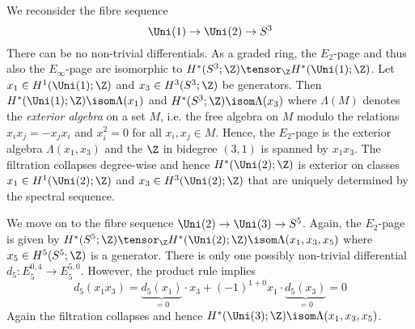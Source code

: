 \documentclass[wip, topology]{bsteffan-lecturenotes}
\begin{document}
\begin{example}
	We reconsider the fibre sequence
	\begin{equation*}
		\Uni(1) \to \Uni(2) \to S^3
	\end{equation*}
	There can be no non-trivial differentials.
	As a graded ring, the $E_2$-page and thus also the $E_\infty$-page are isomorphic to $H^*(S^3; \Z) \tensor_{\Z} H^*(\Uni(1); \Z)$.
	Let $x_1 \in H^1(\Uni(1); \Z)$ and $x_3 \in H^3(S^3; \Z)$ be generators.
	Then $H^*(\Uni(1); \Z) \isom \Lambda(x_1)$ and $H^*(S^3; \Z) \isom \Lambda(x_3)$ where $\Lambda(M)$ denotes the \emph{exterior algebra} on a set $M$, i.e. the free algebra on $M$ modulo the relations $x_i x_j = -x_j x_i$ and $x_i^2 = 0$ for all $x_i, x_j \in M$.
	Hence, the $E_2$-page is the exterior algebra $\Lambda(x_1, x_3)$ and the $\Z$ in bidegree $(3, 1)$ is spanned by $x_1 x_3$.
	The filtration collapses degree-wise and hence $H^*(\Uni(2); \Z)$ is exterior on classes $x_1 \in H^1(\Uni(2); \Z)$ and $x_3 \in H^3(\Uni(2); \Z)$ that are uniquely determined by the spectral sequence.
\end{example}
\begin{example}
	We move on to the fibre sequence $\Uni(2) \to \Uni(3) \to S^5$.
	Again, the $E_2$-page is given by $H^*(S^5; \Z) \tensor_{\Z} H^*(\Uni(2); \Z) \isom \Lambda(x_1, x_3, x_5)$ where $x_5 \in H^5(S^5; \Z)$ is a generator.
	There is only one possibly non-trivial differential $d_5\colon E_5^{0, 4} \to E_5^{5, 0}$.
	However, the product rule implies 
	\begin{equation*}
		d_5(x_1 x_3) = \underbrace{d_5(x_1)}_{= 0} \cdot x_3 + (-1)^{1 + 0} x_1 \cdot \underbrace{d_5(x_3)}_{= 0} = 0
	\end{equation*}
	Again the filtration collapses and hence $H^*(\Uni(3); \Z) \isom \Lambda(x_1, x_3, x_5)$.
\end{example}
\end{document}
